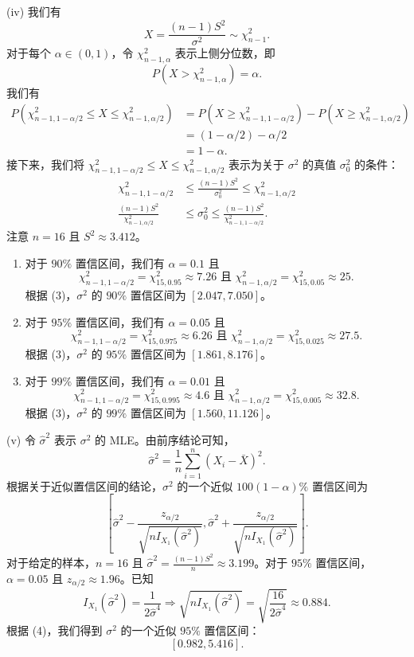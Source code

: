 \begin{questions}
\begin{solution}
(iv) 我们有
\[
X = \frac{(n-1)S^2}{\sigma^2} \sim \chi_{n-1}^2.
\]
对于每个 $\alpha \in (0, 1)$，令 $\chi_{n-1, \alpha}^2$ 表示上侧分位数，即
\[
P(X > \chi_{n-1, \alpha}^2) = \alpha.
\]
我们有
\begin{align*}
P(\chi_{n-1, 1-\alpha/2}^2 \le X \le \chi_{n-1, \alpha/2}^2) &= P(X \ge \chi_{n-1, 1-\alpha/2}^2) - P(X \ge \chi_{n-1, \alpha/2}^2) \\
&= (1 - \alpha/2) - \alpha/2 \\
&= 1 - \alpha.
\end{align*}
接下来，我们将 $\chi_{n-1, 1-\alpha/2}^2 \le X \le \chi_{n-1, \alpha/2}^2$ 表示为关于 $\sigma^2$ 的真值 $\sigma_0^2$ 的条件：
\begin{align*}
\chi_{n-1, 1-\alpha/2}^2 &\le \frac{(n-1)S^2}{\sigma_0^2} \le \chi_{n-1, \alpha/2}^2 \\
\frac{(n-1)S^2}{\chi_{n-1, \alpha/2}^2} &\le \sigma_0^2 \le \frac{(n-1)S^2}{\chi_{n-1, 1-\alpha/2}^2}. \tag{3}
\end{align*}
注意 $n = 16$ 且 $S^2 \approx 3.412$。
\begin{enumerate}
    \item 对于 $90\%$ 置信区间，我们有 $\alpha = 0.1$ 且
    \[
    \chi_{n-1, 1-\alpha/2}^2 = \chi_{15, 0.95}^2 \approx 7.26 \text{ 且 } \chi_{n-1, \alpha/2}^2 = \chi_{15, 0.05}^2 \approx 25.
    \]
    根据 (3)，$\sigma^2$ 的 $90\%$ 置信区间为 $[2.047, 7.050]$。
    \item 对于 $95\%$ 置信区间，我们有 $\alpha = 0.05$ 且
    \[
    \chi_{n-1, 1-\alpha/2}^2 = \chi_{15, 0.975}^2 \approx 6.26 \text{ 且 } \chi_{n-1, \alpha/2}^2 = \chi_{15, 0.025}^2 \approx 27.5.
    \]
    根据 (3)，$\sigma^2$ 的 $95\%$ 置信区间为 $[1.861, 8.176]$。
    \item 对于 $99\%$ 置信区间，我们有 $\alpha = 0.01$ 且
    \[
    \chi_{n-1, 1-\alpha/2}^2 = \chi_{15, 0.995}^2 \approx 4.6 \text{ 且 } \chi_{n-1, \alpha/2}^2 = \chi_{15, 0.005}^2 \approx 32.8.
    \]
    根据 (3)，$\sigma^2$ 的 $99\%$ 置信区间为 $[1.560, 11.126]$。
\end{enumerate}
\end{solution}

\begin{solution}
(v) 令 $\hat{\sigma}^2$ 表示 $\sigma^2$ 的 MLE。由前序结论可知，
\[
\hat{\sigma}^2 = \frac{1}{n} \sum_{i=1}^n (X_i - \bar{X})^2.
\]
根据关于近似置信区间的结论，$\sigma^2$ 的一个近似 $100(1-\alpha)\%$ 置信区间为
\[
\left[ \hat{\sigma}^2 - \frac{z_{\alpha/2}}{\sqrt{n I_{X_1}(\hat{\sigma}^2)}}, \hat{\sigma}^2 + \frac{z_{\alpha/2}}{\sqrt{n I_{X_1}(\hat{\sigma}^2)}} \right]. \tag{4}
\]
对于给定的样本，$n = 16$ 且 $\hat{\sigma}^2 = \frac{(n-1)S^2}{n} \approx 3.199$。对于 $95\%$ 置信区间，$\alpha = 0.05$ 且 $z_{\alpha/2} \approx 1.96$。已知
\[
I_{X_1}(\hat{\sigma}^2) = \frac{1}{2\hat{\sigma}^4} \Rightarrow \sqrt{n I_{X_1}(\hat{\sigma}^2)} = \sqrt{\frac{16}{2\hat{\sigma}^4}} \approx 0.884.
\]
根据 (4)，我们得到 $\sigma^2$ 的一个近似 $95\%$ 置信区间：
\[
[0.982, 5.416].
\]
\end{solution}


\end{questions}
